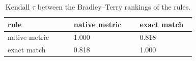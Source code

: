 \begin{table}[htbp]
\centering\scriptsize
\caption{Kendall $\tau$ between the Bradley--Terry rankings of the rules.}
\label{tab:rule_agreement}
\setlength{\tabcolsep}{3pt}
\begin{tabular}{p{0.326\linewidth}p{0.326\linewidth}p{0.276\linewidth}}
\toprule
rule & native metric & exact match \\
\midrule
native metric & 1.000 & 0.818 \\
exact match & 0.818 & 1.000 \\
\bottomrule
\end{tabular}
\end{table}
